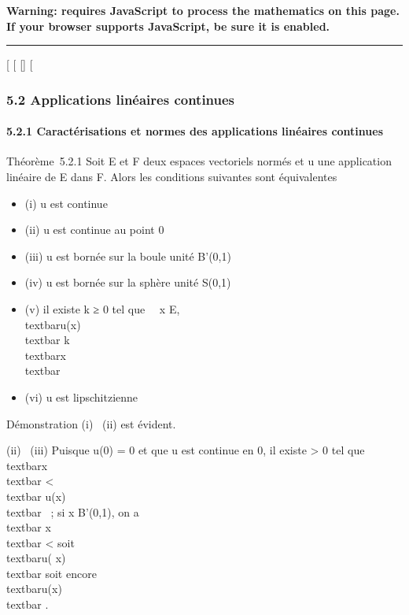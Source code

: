 \textbf{Warning: 
requires JavaScript to process the mathematics on this page.\\ If your
browser supports JavaScript, be sure it is enabled.}

\begin{center}\rule{3in}{0.4pt}\end{center}

{[}
{[}
{[}{]}
{[}

\subsubsection{5.2 Applications linéaires continues}

\paragraph{5.2.1 Caractérisations et normes des applications linéaires
continues}

Théorème~5.2.1 Soit E et F deux espaces vectoriels normés et u une
application linéaire de E dans F. Alors les conditions suivantes sont
équivalentes

\begin{itemize}
\itemsep1pt\parskip0pt
\item
  (i) u est continue
\item
  (ii) u est continue au point 0
\item
  (iii) u est bornée sur la boule unité B'(0,1)
\item
  (iv) u est bornée sur la sphère unité S(0,1)
\item
  (v) il existe k ≥ 0 tel que \forall~~x \in E,
  \\textbar{}u(x)\\textbar{} \leq
  k\\textbar{}x\\textbar{}
\item
  (vi) u est lipschitzienne
\end{itemize}

Démonstration (i) \rigtharrow~(ii) est évident.

(ii) \rigtharrow~(iii) Puisque u(0) = 0 et que u est continue en 0, il existe \eta
\textgreater{} 0 tel que
\\textbar{}x\\textbar{} \textless{} \eta
\rigtharrow~\\textbar{} u(x)\\textbar{} ~; si x \in
B'(0,1), on a \\textbar{} \eta {}
x\\textbar{} \leq \eta {} \textless{} \eta
soit \\textbar{}u( \eta {}
x)\\textbar{}  soit encore
\\textbar{}u(x)\\textbar{} 
\over \eta .

